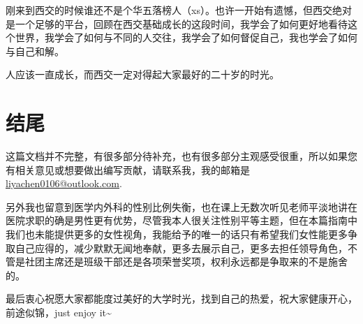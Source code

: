 \documentclass[zihao=-4,fontset=none]{Beautybook-CN}
\begin{document}
刚来到西交的时候谁还不是个华五落榜人（xs）。也许一开始有遗憾，但西交绝对是一个足够的平台，回顾在西交基础成长的这段时间，我学会了如何更好地看待这个世界，我学会了如何与不同的人交往，我学会了如何督促自己，我也学会了如何与自己和解。

人应该一直成长，而西交一定对得起大家最好的二十岁的时光。

\chapter{结尾}

这篇文档并不完整，有很多部分待补充，也有很多部分主观感受很重，所以如果您有相关意见或想要做出编写贡献，请联系我，我的邮箱是\href{mailto:liyachen0106@outlook.com}{liyachen0106@outlook.com}.

另外我也留意到医学内外科的性别比例失衡，也在课上无数次听见老师平淡地讲在医院求职的确是男性更有优势，尽管我本人很关注性别平等主题，但在本篇指南中我们也未能提供更多的女性视角，我能给予的唯一的话只有希望我们女性能更多争取自己应得的，减少默默无闻地奉献，更多去展示自己，更多去担任领导角色，不管是社团主席还是班级干部还是各项荣誉奖项，权利永远都是争取来的不是施舍的。

最后衷心祝愿大家都能度过美好的大学时光，找到自己的热爱，祝大家健康开心，前途似锦，just enjoy it\textasciitilde{}


\ISBNcode{\EANisbn[ISBN=978-80-7340-097-2]} %
\makebottomcover
\end{document}

